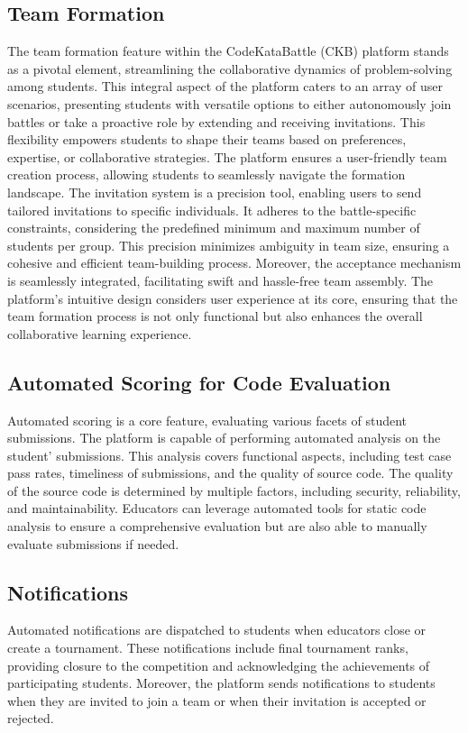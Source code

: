 \subsection*{Team Formation}
The team formation feature within the CodeKataBattle (CKB) platform stands as a pivotal element, streamlining the collaborative dynamics of problem-solving among students. 
This integral aspect of the platform caters to an array of user scenarios, presenting students with versatile options to either autonomously join battles or take a proactive role by extending and receiving invitations. 
This flexibility empowers students to shape their teams based on preferences, expertise, or collaborative strategies.
The platform ensures a user-friendly team creation process, allowing students to seamlessly navigate the formation landscape. 
The invitation system is a precision tool, enabling users to send tailored invitations to specific individuals. 
It adheres to the battle-specific constraints, considering the predefined minimum and maximum number of students per group. 
This precision minimizes ambiguity in team size, ensuring a cohesive and efficient team-building process.
Moreover, the acceptance mechanism is seamlessly integrated, facilitating swift and hassle-free team assembly. 
The platform's intuitive design considers user experience at its core, ensuring that the team formation process is not only functional but also enhances the overall collaborative learning experience.

\subsection*{Automated Scoring for Code Evaluation}
Automated scoring is a core feature, evaluating various facets of student submissions. 
The platform is capable of performing automated analysis on the student' submissions.
This analysis covers functional aspects, including test case pass rates, timeliness of submissions, and the quality of source code.
The quality of the source code is determined by multiple factors, including security, reliability, and maintainability.
Educators can leverage automated tools for static code analysis to ensure a comprehensive evaluation but are also able to manually evaluate submissions if needed.

\subsection*{Notifications}
Automated notifications are dispatched to students when educators close or create a tournament. 
These notifications include final tournament ranks, providing closure to the competition and acknowledging the achievements of participating students.
Moreover, the platform sends notifications to students when they are invited to join a team or when their invitation is accepted or rejected.

